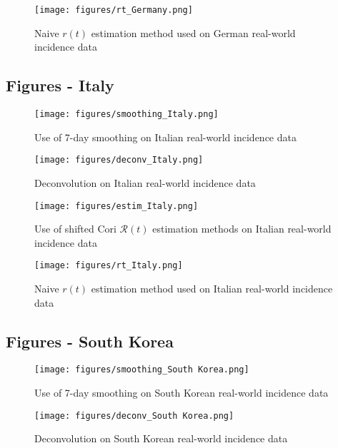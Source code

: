 \documentclass{article}
\newcommand{\nR}{\mathscr{R}}
\newcommand{\nr}{r}
\begin{document}
\clearpage
\begin{figure}[h!]
    \centering
    \texttt{[image: figures/rt\_Germany.png]}
    \caption{Naive $\nr(t)$ estimation method used on German real-world incidence data}
    \label{fig:my_label}
\end{figure}

\clearpage
\subsection{Figures - Italy}
\begin{figure}[h!]
    \centering
    \texttt{[image: figures/smoothing\_Italy.png]}
    \caption{Use of 7-day smoothing on Italian real-world incidence data}
    \label{fig:my_label}
\end{figure}

\begin{figure}
    \centering
    \texttt{[image: figures/deconv\_Italy.png]}
    \caption{Deconvolution on Italian real-world incidence data}
    \label{fig:my_label}
\end{figure}

\begin{figure}[h!]
    \centering
    \texttt{[image: figures/estim\_Italy.png]}
    \caption{Use of shifted Cori $\nR(t)$ estimation methods on Italian real-world incidence data}
    \label{fig:my_label}
\end{figure}

\clearpage
\begin{figure}[h!]
    \centering
    \texttt{[image: figures/rt\_Italy.png]}
    \caption{Naive $\nr(t)$ estimation method used on Italian real-world incidence data}
    \label{fig:my_label}
\end{figure}

\clearpage
\subsection{Figures - South Korea}
\begin{figure}[h!]
    \centering
    \texttt{[image: figures/smoothing\_South Korea.png]}
    \caption{Use of 7-day smoothing on South Korean real-world incidence data}
    \label{fig:my_label}
\end{figure}

\begin{figure}
    \centering
    \texttt{[image: figures/deconv\_South Korea.png]}
    \caption{Deconvolution on South Korean real-world incidence data}
    \label{fig:my_label}
\end{figure}
\end{document}
